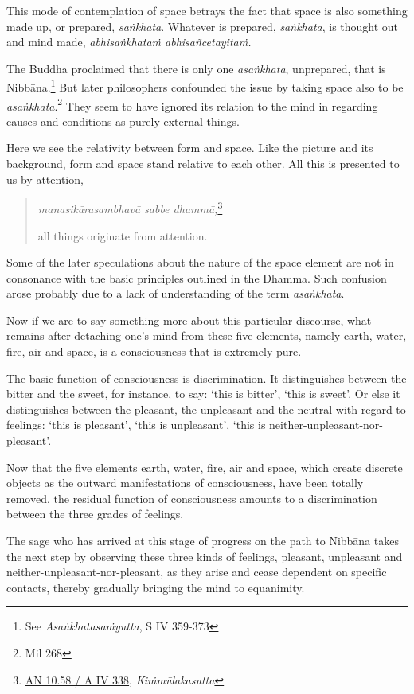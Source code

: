 This mode of contemplation of space betrays the fact that space is also something made up, or prepared, \emph{saṅkhata}. Whatever is prepared, \emph{saṅkhata}, is thought out and mind made, \emph{abhisaṅkhataṁ abhisañcetayitaṁ.}

The Buddha proclaimed that there is only one \emph{asaṅkhata}, unprepared, that is Nibbāna.\footnote{See \emph{Asaṅkhatasaṁyutta}, S IV 359-373} But later philosophers confounded the issue by taking space also to be \emph{asaṅkhata}.\footnote{Mil 268} They seem to have ignored its relation to the mind in regarding causes and conditions as purely external things.

Here we see the relativity between form and space. Like the picture and its background, form and space stand relative to each other. All this is presented to us by attention,

\begin{quote}
\emph{manasikārasambhavā sabbe dhammā,}\footnote{\href{https://suttacentral.net/an10.58/pli/ms}{AN 10.58 / A IV 338}, \emph{Kiṁmūlakasutta}}

all things originate from attention.
\end{quote}

Some of the later speculations about the nature of the space element are not in consonance with the basic principles outlined in the Dhamma. Such confusion arose probably due to a lack of understanding of the term \emph{asaṅkhata}.

Now if we are to say something more about this particular discourse, what remains after detaching one's mind from these five elements, namely earth, water, fire, air and space, is a consciousness that is extremely pure.

The basic function of consciousness is discrimination. It distinguishes between the bitter and the sweet, for instance, to say: `this is bitter', `this is sweet'. Or else it distinguishes between the pleasant, the unpleasant and the neutral with regard to feelings: `this is pleasant', `this is unpleasant', `this is neither-unpleasant-nor-pleasant'.

Now that the five elements earth, water, fire, air and space, which create discrete objects as the outward manifestations of consciousness, have been totally removed, the residual function of consciousness amounts to a discrimination between the three grades of feelings.

The sage who has arrived at this stage of progress on the path to Nibbāna takes the next step by observing these three kinds of feelings, pleasant, unpleasant and neither-unpleasant-nor-pleasant, as they arise and cease dependent on specific contacts, thereby gradually bringing the mind to equanimity.

